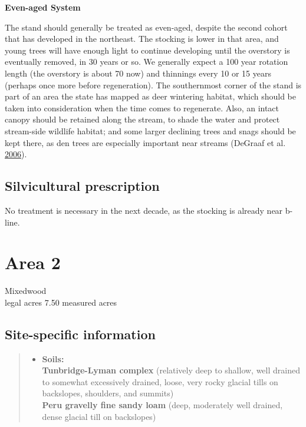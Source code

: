\documentclass[]{tufte-handout}
\providecommand{\tightlist}{%
  \setlength{\itemsep}{0pt}\setlength{\parskip}{0pt}}
\begin{document}
\textbf{Even-aged System}

The stand should generally be treated as even-aged, despite the second
cohort that has developed in the northeast. The stocking is lower in
that area, and young trees will have enough light to continue developing
until the overstory is eventually removed, in 30 years or so. We
generally expect a 100 year rotation length (the overstory is about 70
now) and thinnings every 10 or 15 years (perhaps once more before
regeneration). The southernmost corner of the stand is part of an area
the state has mapped as deer wintering habitat, which should be taken
into consideration when the time comes to regenerate. Also, an intact
canopy should be retained along the stream, to shade the water and
protect stream-side wildlife habitat; and some larger declining trees
and snags should be kept there, as den trees are especially important
near streams (DeGraaf et al.
\protect\hyperlink{ref-degraaf_technical_2006}{2006}).

\subsection{Silvicultural
prescription}\label{silvicultural-prescription}

No treatment is necessary in the next decade, as the stocking is already
near b-line.

\newpage

\section{Area 2}\label{area-2}

Mixedwood\\
 legal acres \textbar{} 7.50 measured acres

\subsection{Site-specific
information}\label{site-specific-information-1}

\begin{quote}
\begin{itemize}
\tightlist
\item
  \textbf{Soils:}\\
  \indent\indent  \textbf{Tunbridge-Lyman complex} (relatively deep to
  shallow, well drained to somewhat excessively drained, loose, very
  rocky glacial tills on backslopes, shoulders, and summits)\\
  \textbf{Peru gravelly fine sandy loam} (deep, moderately well drained,
  dense glacial till on backslopes)
\end{itemize}
\end{quote}
\end{document}
